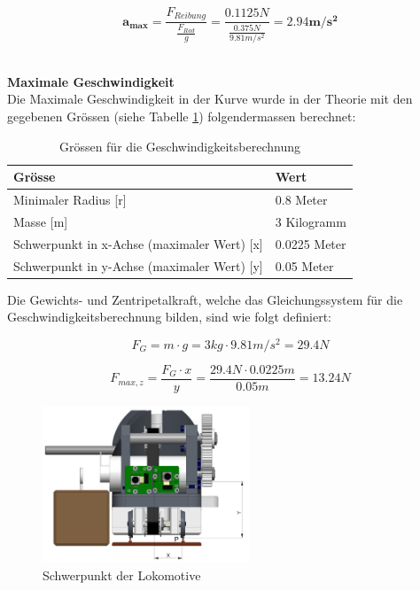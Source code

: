 \documentclass[../../main.tex]{subfiles}
\begin{document}
$$\boldsymbol{a_{max}}=\frac{F_{Reibung}}{\frac{F_{Rad}}{g}}=\frac{0.1125N}{\frac{0.375N}{9.81m/s^2}}=\boldsymbol{2.94m/s^2}$$
\\

\pagebreak

\textbf{Maximale Geschwindigkeit}\\
Die Maximale Geschwindigkeit in der Kurve wurde in der Theorie mit den gegebenen Grössen (siehe Tabelle \ref{tab:geschwindigkeitsberechnung}) folgendermassen berechnet:\\

\begin{table}[H] \centering
    \begin{tabular}{|l|l|}
    \hline
    \textbf{Grösse} & \textbf{Wert}\\
    \hline
    Minimaler Radius  [r]                               & 0.8 Meter\\
     \hline
    Masse [m]                                           & 3 Kilogramm\\
    \hline
    Schwerpunkt in x-Achse (maximaler Wert) [x]         & 0.0225 Meter\\
    \hline
    Schwerpunkt in y-Achse (maximaler Wert) [y]         & 0.05 Meter\\
    \hline
    \end{tabular}

    \caption{Grössen für die Geschwindigkeitsberechnung}
    \label{tab:geschwindigkeitsberechnung}
    \end{table}

Die Gewichts- und Zentripetalkraft, welche das Gleichungssystem für die Geschwindigkeitsberechnung bilden, sind wie folgt definiert:

$$F_{G}=m \cdot g=3kg \cdot 9.81m/s^2=29.4N$$

$$F_{max, z}=\frac{F_{G} \cdot x}{y}=\frac{29.4N \cdot 0.0225m}{0.05m}=13.24N$$

\begin{figure}[H]
    \centering
    \includegraphics[width=0.55\textwidth]{schwerpunkt.PNG}
    \caption {Schwerpunkt der Lokomotive}
    \label{fig:schwerpunkt}
\end{figure}
\end{document}
